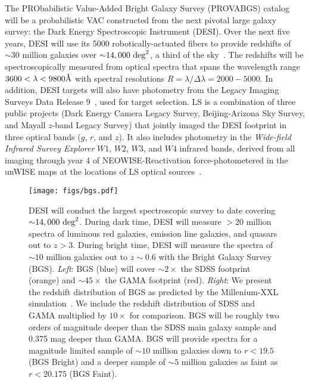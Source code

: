 The PRObabilistic Value-Added Bright Galaxy Survey (PROVABGS) catalog will be a
probabilistic VAC constructed from the next pivotal large galaxy survey: the
Dark Energy Spectroscopic Instrument (DESI).
Over the next five years, DESI will use its 5000 robotically-actuated fibers to
provide redshifts of ${\sim}30$ million galaxies over 
${\sim}14,000~{\rm deg}^2$, a third of the sky~\citep{desicollaboration2016,
desicollaboration2016a}.
The redshifts will be spectroscopically measured from optical spectra that
spans the wavelength range $3600 < \lambda < 9800\AA$ with spectral resolutions
$R = \lambda/\Delta \lambda = 2000 - 5000$.
In addition, DESI targets will also have photometry from the Legacy Imaging
Surveys Data Release 9~\citep[LS;][]{dey2019}, used for target selection. 
LS is a combination of three public projects (Dark Energy Camera Legacy Survey,
Beijing-Arizona Sky Survey, and Mayall $z$-band Legacy Survey) that jointly
imaged the DESI footprint in three optical bands ($g$, $r$, and $z$). 
It also includes photometry in the \emph{Wide-field Infrared Survey Explorer}
$W1$, $W2$, $W3$, and $W4$ infrared bands, derived from all imaging through
year 4 of NEOWISE-Reactivation force-photometered in the unWISE maps at the
locations of LS optical sources~\citep{meisner2017a, meisner2017}.

\begin{figure}
\begin{center}
\texttt{[image: figs/bgs.pdf]} 
\caption{
    DESI will conduct the largest spectroscopic survey to date covering
    ${\sim}14,000~{\rm deg}^2$. 
    During dark time, DESI will measure ${>}20$ million spectra of luminous red
    galaxies, emission line galaxies, and quasars out to $z > 3$.
    During bright time, DESI will measure the spectra of ${\sim}10$ million
    galaxies out to $z{\sim}0.6$ with the Bright Galaxy Survey (BGS).
    {\em Left}: BGS (blue) will cover ${\sim}2\times$ the SDSS footprint
    (orange) and ${\sim}45\times$ the GAMA footprint (red).
    {\em Right}: We present the redshift distribution of BGS as predicted by
    the Millenium-XXL simulation~\citep[blue;][]{smith2017}. 
    We include the redshift distribution of SDSS and GAMA multiplied by
    $10\times$ for comparison. 
    BGS will be roughly two orders of magnitude deeper than the SDSS main
    galaxy sample and 0.375 mag deeper than GAMA.
    BGS will provide spectra for a magnitude limited sample of ${\sim}10$
    million galaxies down to $r < 19.5$ (BGS Bright) and a deeper sample of
    ${\sim 5}$ million galaxies as faint as $r < 20.175$ (BGS Faint).
}
\label{fig:bgs}
\end{center}
\end{figure}

